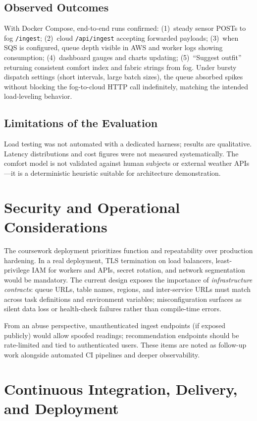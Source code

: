 \documentclass[conference]{IEEEtran}
\begin{document}
\subsection{Observed Outcomes}
With Docker Compose, end-to-end runs confirmed: (1)~steady sensor POSTs to fog \texttt{/ingest}; (2)~cloud \texttt{/api/ingest} accepting forwarded payloads; (3)~when SQS is configured, queue depth visible in AWS and worker logs showing consumption; (4)~dashboard gauges and charts updating; (5)~``Suggest outfit'' returning consistent comfort index and fabric strings from fog. Under bursty dispatch settings (short intervals, large batch sizes), the queue absorbed spikes without blocking the fog-to-cloud HTTP call indefinitely, matching the intended load-leveling behavior.

\subsection{Limitations of the Evaluation}
Load testing was not automated with a dedicated harness; results are qualitative. Latency distributions and cost figures were not measured systematically. The comfort model is not validated against human subjects or external weather APIs---it is a deterministic heuristic suitable for architecture demonstration.

\section{Security and Operational Considerations}

The coursework deployment prioritizes function and repeatability over production hardening. In a real deployment, TLS termination on load balancers, least-privilege IAM for workers and APIs, secret rotation, and network segmentation would be mandatory. The current design exposes the importance of \emph{infrastructure contracts}: queue URLs, table names, regions, and inter-service URLs must match across task definitions and environment variables; misconfiguration surfaces as silent data loss or health-check failures rather than compile-time errors.

From an abuse perspective, unauthenticated ingest endpoints (if exposed publicly) would allow spoofed readings; recommendation endpoints should be rate-limited and tied to authenticated users. These items are noted as follow-up work alongside automated CI pipelines and deeper observability.

\section{Continuous Integration, Delivery, and Deployment}
\end{document}
